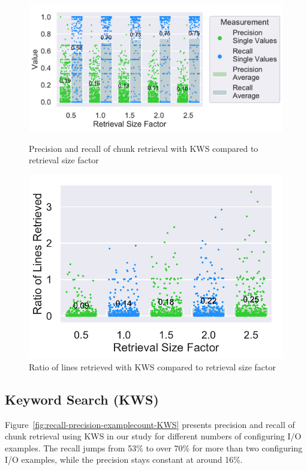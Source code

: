 \documentclass[\myrootdir/main.tex]{subfiles}
\begin{document}
\begin{figure}[htbp]
	\centering
	\begin{minipage}{0.45\textwidth}
		\centering
		\includegraphics[width=\textwidth, clip]{img/big-study/contextsizefactor-precision-recall-KWS.pdf}
		\caption{Precision and recall of chunk retrieval with KWS compared to retrieval size factor}
		\label{fig:contextsizefactor-precision-recall-KWS}
	\end{minipage}\hfill
	\begin{minipage}{0.45\textwidth}
		\centering
		\includegraphics[width=\textwidth, clip]{img/big-study/retrievalsizefactor-retrievalratio-KWS.pdf}
		\caption{Ratio of lines retrieved with KWS compared to retrieval size factor}
		\label{fig:retrievalsizefactor-retrievalratio-KWS}
	\end{minipage}
\end{figure}


\subsection{Keyword Search (KWS)}
Figure~\ref{fig:recall-precision-examplecount-KWS} presents precision and recall of chunk retrieval using KWS in our study for different numbers of configuring I/O examples.
The recall jumps from 53\% to over 70\% for more than two configuring I/O examples, while the precision stays constant at around 16\%.
\end{document}
